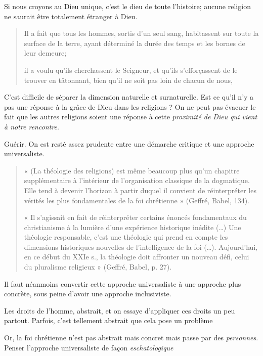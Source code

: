 Si nous croyons au Dieu unique, c'est le dieu de toute l'histoire; aucune religion ne saurait être totalement étranger à Dieu.
\begin{quote}
    Il a fait que tous les hommes, sortis d'un seul sang, habitassent sur toute la surface de la terre, ayant déterminé la durée des temps et les bornes de leur demeure;

 il a voulu qu'ils cherchassent le Seigneur, et qu'ils s'efforçassent de le trouver en tâtonnant, bien qu'il ne soit pas loin de chacun de nous,
\end{quote}

C'est difficile de séparer la dimension naturelle et surnaturelle. Est ce qu'il n'y a pas une réponse à la grâce de Dieu dans les religions ? On ne peut pas évacuer le fait que les autres religions soient une réponse à cette \textit{proximité de Dieu qui vient à notre rencontre}. 



Guérir.
 On est resté assez prudente entre une démarche critique et une approche universaliste.
\begin{quote}
    
« (La théologie des religions) est même beaucoup plus qu’un chapitre supplémentaire à l’intérieur
de l’organisation classique de la dogmatique. Elle tend à devenir l’horizon à partir duquel il
convient de réinterpréter les vérités les plus fondamentales de la foi chrétienne » (Geffré, Babel,
134).

« Il s’agissait en fait de réinterpréter certains énoncés fondamentaux du christianisme à la lumière
d’une expérience historique inédite (…) Une théologie responsable, c’est une théologie qui prend
en compte les dimensions historiques nouvelles de l’intelligence de la foi (…). Aujourd’hui, en ce
début du XXIe s., la théologie doit affronter un nouveau défi, celui du pluralisme religieux »
(Geffré, Babel, p. 27). 
\end{quote}
Il faut néanmoins convertir cette approche universaliste à une approche plus concrète, sous peine d'avoir une approche inclusiviste.

\begin{Ex}
Les droits de l'homme, abstrait, et on essaye d'appliquer ces droits un peu partout. Parfois, c'est tellement abstrait que cela pose un problème
\end{Ex}
\begin{Synthesis}
Or, la foi chrétienne n'est pas abstrait mais concret mais passe par des \textit{personnes}. Penser l'approche universaliste de façon \textit{eschatologique}

\end{Synthesis}

